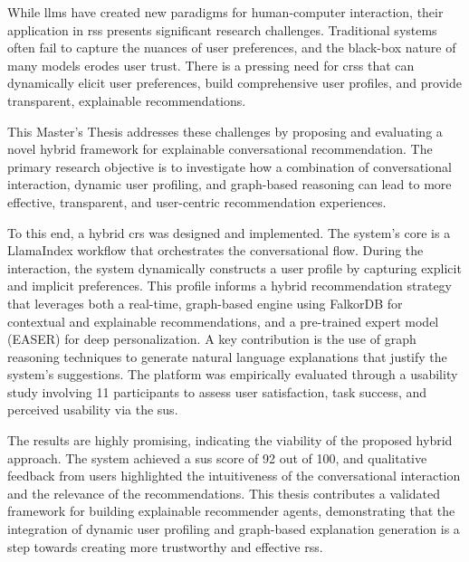 
While \acp{llm} have created new paradigms for human-computer interaction, their application in \acp{rs} presents significant research challenges. Traditional systems often fail to capture the nuances of user preferences, and the black-box nature of many models erodes user trust. There is a pressing need for \aclp{crs} that can dynamically elicit user preferences, build comprehensive user profiles, and provide transparent, explainable recommendations.

This Master's Thesis addresses these challenges by proposing and evaluating a novel hybrid framework for explainable conversational recommendation. The primary research objective is to investigate how a combination of conversational interaction, dynamic user profiling, and graph-based reasoning can lead to more effective, transparent, and user-centric recommendation experiences.

To this end, a hybrid \acl{crs} was designed and implemented. The system's core is a LlamaIndex workflow that orchestrates the conversational flow. During the interaction, the system dynamically constructs a user profile by capturing explicit and implicit preferences. This profile informs a hybrid recommendation strategy that leverages both a real-time, graph-based engine using FalkorDB for contextual and explainable recommendations, and a pre-trained expert model (EASER) for deep personalization. A key contribution is the use of graph reasoning techniques to generate natural language explanations that justify the system's suggestions. The platform was empirically evaluated through a usability study involving 11 participants to assess user satisfaction, task success, and perceived usability via the \ac{sus}.

The results are highly promising, indicating the viability of the proposed hybrid approach. The system achieved a \acs{sus} score of 92 out of 100, and qualitative feedback from users highlighted the intuitiveness of the conversational interaction and the relevance of the recommendations. This thesis contributes a validated framework for building explainable recommender agents, demonstrating that the integration of dynamic user profiling and graph-based explanation generation is a step towards creating more trustworthy and effective \aclp{rs}.

